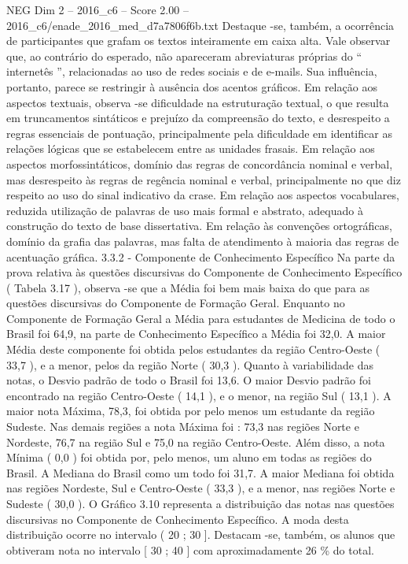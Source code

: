 \begin{textsample}{NEG Dim 2 – 2016\_c6 – Score 2.00 – 2016\_c6/enade\_2016\_med\_d7a7806f6b.txt}
Destaque -se, também, a ocorrência de participantes que grafam os textos inteiramente em caixa alta.
Vale observar que, ao contrário do esperado, não apareceram abreviaturas próprias do “ internetês ”, relacionadas ao uso de redes sociais e de e-mails.
Sua influência, portanto, parece se restringir à ausência dos acentos gráficos.
Em relação aos aspectos textuais, observa -se dificuldade na estruturação textual, o que resulta em truncamentos sintáticos e prejuízo da compreensão do texto, e desrespeito a regras essenciais de pontuação, principalmente pela dificuldade em identificar as relações lógicas que se estabelecem entre as unidades frasais.
Em relação aos aspectos morfossintáticos, domínio das regras de concordância nominal e verbal, mas desrespeito às regras de regência nominal e verbal, principalmente no que diz respeito ao uso do sinal indicativo da crase.
Em relação aos aspectos vocabulares, reduzida utilização de palavras de uso mais formal e abstrato, adequado à construção do texto de base dissertativa.
Em relação às convenções ortográficas, domínio da grafia das palavras, mas falta de atendimento à maioria das regras de acentuação gráfica. 3.3.2 - Componente de Conhecimento Específico Na parte da prova relativa às questões discursivas do Componente de Conhecimento Específico ( Tabela 3.17 ), observa -se que a Média foi bem mais baixa do que para as questões discursivas do Componente de Formação Geral.
Enquanto no Componente de Formação Geral a Média para estudantes de Medicina de todo o Brasil foi 64,9, na parte de Conhecimento Específico a Média foi 32,0.
A maior Média deste componente foi obtida pelos estudantes da região Centro-Oeste ( 33,7 ), e a menor, pelos da região Norte ( 30,3 ).
Quanto à variabilidade das notas, o Desvio padrão de todo o Brasil foi 13,6.
O maior Desvio padrão foi encontrado na região Centro-Oeste ( 14,1 ), e o menor, na região Sul ( 13,1 ).
A maior nota Máxima, 78,3, foi obtida por pelo menos um estudante da região Sudeste.
Nas demais regiões a nota Máxima foi : 73,3 nas regiões Norte e Nordeste, 76,7 na região Sul e 75,0 na região Centro-Oeste.
Além disso, a nota Mínima ( 0,0 ) foi obtida por, pelo menos, um aluno em todas as regiões do Brasil.
A Mediana do Brasil como um todo foi 31,7.
A maior Mediana foi obtida nas regiões Nordeste, Sul e Centro-Oeste ( 33,3 ), e a menor, nas regiões Norte e Sudeste ( 30,0 ).
O Gráfico 3.10 representa a distribuição das notas nas questões discursivas no Componente de Conhecimento Específico.
A moda desta distribuição ocorre no intervalo ( 20 ; 30 ].
Destacam -se, também, os alunos que obtiveram nota no intervalo [ 30 ; 40 ] com aproximadamente 26 \% do total.

\end{textsample}

